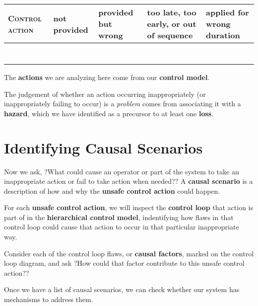 \documentclass[letterpaper]{tufte-book}
\begin{document}
\begin{table}
\renewcommand{\arraystretch}{3}
\begin{tabular}{|p{3cm}|p{3cm}|p{3cm}|p{3cm}|p{3cm}|}
\hline
\textsc{Control action}&\textbf{not provided}&\textbf{provided but wrong}&\textbf{too late, too early, or out of sequence}&\textbf{applied for wrong duration}\\
\hline
&&&&\\
\hline
&&&&\\
\hline
&&&&\\
\hline
&&&&\\
\hline
&&&&\\
\hline
&&&&\\
\hline
&&&&\\
\hline
\end{tabular}
\vspace{1em}
\end{table}


The \textbf{actions} we are analyzing here come from our \textbf{control model}.

The judgement of whether an action occurring inappropriately (or inappropriately failing to occur) is a \emph{problem} comes from associating it with a \textbf{hazard}, which we have identified as a precursor to at least one \textbf{loss}.

\section{Identifying Causal Scenarios}


Now we ask, ?What could cause an operator or part of the system to take an inappropriate action or fail to take action when needed?? A \textbf{causal scenario} is a description of how and why the \textbf{unsafe control action} could happen.

For each \textbf{unsafe control action}, we will inspect the \textbf{control loop} that action is part of in the \textbf{hierarchical control model}, indentifying how flaws in that control loop could cause that action to occur in that particular inappropriate way.

Consider each of the control loop flaws, or \textbf{causal factors}, marked on the control loop diagram, and ask ?How could that factor contribute to this unsafe control action?? 

Once we have a list of causal scenarios, we can check whether our system has mechanisms to address them.
\end{document}
